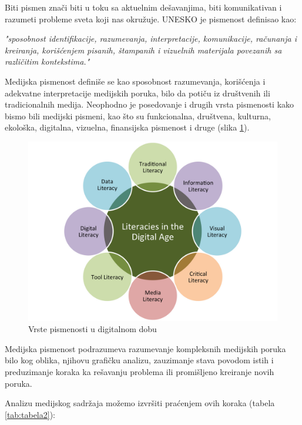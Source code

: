 \documentclass[a4paper]{article}
\begin{document}
Biti pismen znači biti u toku sa aktuelnim dešavanjima, biti komunikativan i razumeti probleme sveta koji nas okružuje. UNESKO je pismenost definisao kao:

\noindent \textit{"sposobnost identifikacije, razumevanja, interpretacije, komunikacije, računanja i kreiranja, korišćenjem pisanih, štampanih i vizuelnih materijala povezanih sa različitim kontekstima."}

Medijska pismenost definiše se kao sposobnost razumevanja, korišćenja i adekvatne interpretacije medijskih poruka, bilo da potiču iz društvenih ili tradicionalnih medija. Neophodno je posedovanje i drugih vrsta pismenosti kako bismo bili medijski pismeni, kao što su funkcionalna, društvena, kulturna, ekološka, digitalna, vizuelna, finansijska pismenost i druge \cite{literacy} (slika \ref{fig:literacies}).  

\begin{figure}[h!]
\begin{center}
\includegraphics[scale=0.35]{literacies.png}
\end{center}
\caption{Vrste pismenosti u digitalnom dobu}
\label{fig:literacies}
\end{figure}

Medijska pismenost podrazumeva razumevanje kompleksnih medijskih poruka bilo kog oblika, njihovu grafičku analizu, zauzimanje stava povodom istih i preduzimanje koraka ka rešavanju problema ili promišljeno kreiranje novih poruka.

Analizu medijskog sadržaja možemo izvršiti praćenjem ovih koraka \cite{tab2} (tabela \ref{tab:tabela2}):
\end{document}
